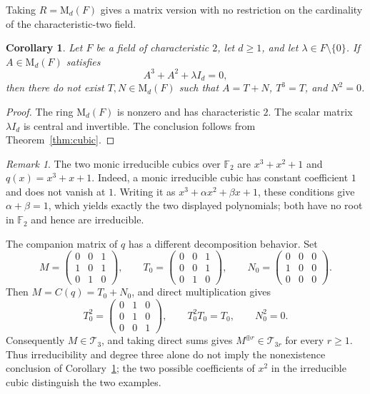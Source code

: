 \documentclass[12pt]{amsart}
\newtheorem{corollary}[theorem]{Corollary}
\theoremstyle{remark}
\newtheorem{remark}[theorem]{Remark}
\numberwithin{equation}{section}
\theoremstyle{definition}
\newcommand{\F}{\mathbb F}
\newcommand{\Mat}{\mathrm M}
\newcommand{\Id}{I}
\newcommand{\TS}{\mathcal T}
\begin{document}
Taking $R=\Mat_d(F)$ gives a matrix version with no restriction on the cardinality of the characteristic-two field.

\begin{corollary}\label{cor:field}
Let $F$ be a field of characteristic $2$, let $d\geq1$, and let $\lambda\in F\setminus\{0\}$. If $A\in\Mat_d(F)$ satisfies
\[
 A^3+A^2+\lambda\Id_d=0,
\]
then there do not exist $T,N\in\Mat_d(F)$ such that $A=T+N$, $T^3=T$, and $N^2=0$.
\end{corollary}

\begin{proof}
The ring $\Mat_d(F)$ is nonzero and has characteristic $2$. The scalar matrix $\lambda\Id_d$ is central and invertible. The conclusion follows from Theorem~\ref{thm:cubic}.
\end{proof}


\begin{remark}\label{rem:other-cubic}
The two monic irreducible cubics over $\F_2$ are $x^3+x^2+1$ and $q(x)=x^3+x+1$. Indeed, a monic irreducible cubic has constant coefficient $1$ and does not vanish at $1$. Writing it as $x^3+\alpha x^2+\beta x+1$, these conditions give $\alpha+\beta=1$, which yields exactly the two displayed polynomials; both have no root in $\F_2$ and hence are irreducible.

The companion matrix of $q$ has a different decomposition behavior. Set
\[
 M=\begin{pmatrix}0&0&1\\1&0&1\\0&1&0\end{pmatrix},\qquad
 T_0=\begin{pmatrix}0&0&1\\0&0&1\\0&1&0\end{pmatrix},\qquad
 N_0=\begin{pmatrix}0&0&0\\1&0&0\\0&0&0\end{pmatrix}.
\]
Then $M=C(q)=T_0+N_0$, and direct multiplication gives
\[
 T_0^2=\begin{pmatrix}0&1&0\\0&1&0\\0&0&1\end{pmatrix},
 \qquad T_0^2T_0=T_0,\qquad N_0^2=0.
\]
Consequently $M\in\TS_3$, and taking direct sums gives $M^{\oplus r}\in\TS_{3r}$ for every $r\geq1$. Thus irreducibility and degree three alone do not imply the nonexistence conclusion of Corollary~\ref{cor:field}; the two possible coefficients of $x^2$ in the irreducible cubic distinguish the two examples.
\end{remark}
\end{document}
